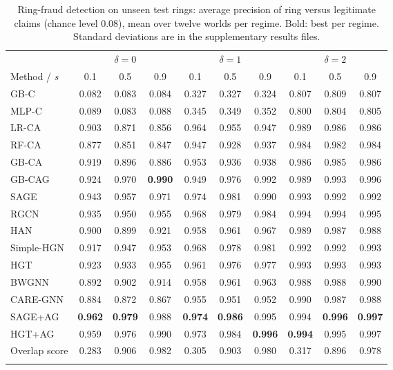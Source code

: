 \documentclass[pdflatex,sn-vancouver-num]{sn-jnl}
\begin{document}
\begin{table}[h]
\caption{Ring-fraud detection on unseen test rings: average precision of ring versus legitimate claims (chance level 0.08), mean over twelve worlds per regime. Bold: best per regime. Standard deviations are in the supplementary results files.}\label{tab:regime_ringap}
\scriptsize
\setlength{\tabcolsep}{4pt}
\begin{tabular}{@{}lccccccccc@{}}
\toprule
 & \multicolumn{3}{c}{$\delta=0$} & \multicolumn{3}{c}{$\delta=1$} & \multicolumn{3}{c}{$\delta=2$} \\
\cmidrule(lr){2-4}\cmidrule(lr){5-7}\cmidrule(lr){8-10}
Method / $s$ & 0.1 & 0.5 & 0.9 & 0.1 & 0.5 & 0.9 & 0.1 & 0.5 & 0.9 \\
\midrule
GB-C & 0.082 & 0.083 & 0.084 & 0.327 & 0.327 & 0.324 & 0.807 & 0.809 & 0.807 \\
MLP-C & 0.089 & 0.083 & 0.088 & 0.345 & 0.349 & 0.352 & 0.800 & 0.804 & 0.805 \\
LR-CA & 0.903 & 0.871 & 0.856 & 0.964 & 0.955 & 0.947 & 0.989 & 0.986 & 0.986 \\
RF-CA & 0.877 & 0.851 & 0.847 & 0.947 & 0.928 & 0.937 & 0.984 & 0.982 & 0.984 \\
GB-CA & 0.919 & 0.896 & 0.886 & 0.953 & 0.936 & 0.938 & 0.986 & 0.985 & 0.986 \\
GB-CAG & 0.924 & 0.970 & \textbf{0.990} & 0.949 & 0.976 & 0.992 & 0.989 & 0.993 & 0.996 \\
\midrule
SAGE & 0.943 & 0.957 & 0.971 & 0.974 & 0.981 & 0.990 & 0.993 & 0.992 & 0.992 \\
RGCN & 0.935 & 0.950 & 0.955 & 0.968 & 0.979 & 0.984 & 0.994 & 0.994 & 0.995 \\
HAN & 0.900 & 0.899 & 0.921 & 0.958 & 0.961 & 0.967 & 0.989 & 0.987 & 0.988 \\
Simple-HGN & 0.917 & 0.947 & 0.953 & 0.968 & 0.978 & 0.981 & 0.992 & 0.992 & 0.993 \\
HGT & 0.923 & 0.933 & 0.955 & 0.961 & 0.976 & 0.977 & 0.993 & 0.993 & 0.993 \\
\midrule
BWGNN & 0.892 & 0.902 & 0.914 & 0.958 & 0.961 & 0.963 & 0.988 & 0.988 & 0.990 \\
CARE-GNN & 0.884 & 0.872 & 0.867 & 0.955 & 0.951 & 0.952 & 0.990 & 0.987 & 0.988 \\
\midrule
SAGE+AG & \textbf{0.962} & \textbf{0.979} & 0.988 & \textbf{0.974} & \textbf{0.986} & 0.995 & 0.994 & \textbf{0.996} & \textbf{0.997} \\
HGT+AG & 0.959 & 0.976 & 0.990 & 0.973 & 0.984 & \textbf{0.996} & \textbf{0.994} & 0.995 & 0.997 \\
Overlap score & 0.283 & 0.906 & 0.982 & 0.305 & 0.903 & 0.980 & 0.317 & 0.896 & 0.978 \\
\botrule
\end{tabular}
\end{table}
\end{document}
